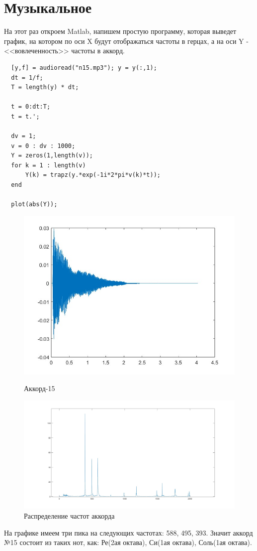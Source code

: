   \section{Музыкальное}
  \noindent На этот раз откроем Matlab, напишем простую программу, которая выведет график, на котором по оси X будут отображаться частоты в герцах, а на оси Y - <<вовлеченность>> частоты в  аккорд. 
   \begin{lstlisting}
  [y,f] = audioread("n15.mp3"); y = y(:,1);
  dt = 1/f; 
  T = length(y) * dt;
  
  t = 0:dt:T;
  t = t.';

  dv = 1;
  v = 0 : dv : 1000;
  Y = zeros(1,length(v));
  for k = 1 : length(v)
      Y(k) = trapz(y.*exp(-1i*2*pi*v(k)*t));
  end

  plot(abs(Y));
  \end{lstlisting}
  \begin{figure}[!htb]
      \includegraphics[width=\linewidth]{../image/music_case_imgs/soundwave.jpeg}
      \caption{Аккорд-15}
    \endminipage\hfill
      \includegraphics[width=\linewidth]{../image/music_case_imgs/hist_music.jpg}
      \caption{Распределение частот аккорда}
    \endminipage\hfill
    \end{figure}
  На графике имеем три пика на следующих частотах: 588, 495, 393. Значит аккорд №15 состоит из таких нот, как: Ре(2ая октава), Си(1ая октава), Соль(1ая октава).
  
  